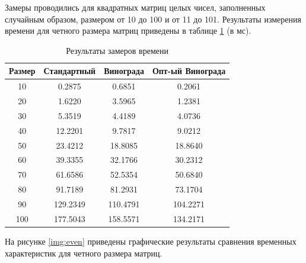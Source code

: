 Замеры проводились для квадратных матриц целых чисел, заполненных случайным образом, размером от 10 до 100 и от 11 до 101. Результаты измерения времени для четного размера матриц приведены в таблице \ref{tbl:time_even} (в мс).

\begin{table}[h]
    \begin{center}
        \begin{threeparttable}
        \captionsetup{justification=raggedright,singlelinecheck=off}
        \caption{Результаты замеров времени}
        \label{tbl:time_even}
        \begin{tabular}{|c|c|c|c|}
            \hline
            Размер & Стандартный & Винограда & Опт-ый Винограда  \\
            \hline
		    10 & 0.2875 & 0.6851 & 0.2061 \\
			\hline
			20 & 1.6220 & 3.5965 & 1.2381 \\
			\hline
			30 & 5.3519 & 4.4189 & 4.0736 \\
			\hline
			40 & 12.2201 & 9.7817 & 9.0212 \\
			\hline
			50 & 23.4212 & 18.8085 & 18.8640 \\
			\hline
			60 & 39.3355 & 32.1766 & 30.2312 \\
			\hline
			70 & 61.6586 & 52.5354 & 50.6840 \\
			\hline
			80 & 91.7189 & 81.2931 & 73.1704 \\
			\hline
			90 & 129.2349 & 110.4791 & 104.2271 \\
			\hline
			100 & 177.5043 & 158.5571 & 134.2171 \\
			\hline
		\end{tabular}
    \end{threeparttable}
\end{center}
\end{table}

На рисунке \ref{img:even} приведены графические результаты сравнения временных характеристик для четного размера матриц.

